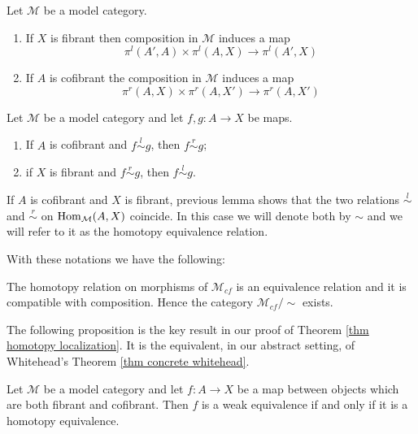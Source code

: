 \begin{lemma} \label{lemma hom homotopy category}
Let $\mathcal M$ be a model category.
\begin{enumerate}
\item If $X$ is fibrant then composition in $\mathcal M$ induces a map
\[
\pi^l(A',A) \times \pi^l(A,X) \to \pi^l(A',X)
\]
\item If $A$ is cofibrant the composition in $\mathcal M$ induces a map
\[
\pi^r(A,X) \times \pi^r(A,X') \to \pi^r(A,X')
\]
\end{enumerate}
\end{lemma}

\begin{lemma}
Let $\mathcal M$ be a model category and let $f,g \colon A \to X$ be maps.
\begin{enumerate}
\item If $A$ is cofibrant and $f \stackrel{l}{\sim} g$, then $f \stackrel{r}{\sim} g$;
\item if $X$ is fibrant and $f \stackrel{r}{\sim} g$, then $f \stackrel{l}{\sim} g$.
\end{enumerate}
\end{lemma}

\begin{notation}
If $A$ is cofibrant and $X$ is fibrant, previous lemma shows that the two relations $\stackrel{l}{\sim}$ and $\stackrel{r}{\sim}$ on $\mathrm{Hom}_{\mathcal M}(A,X)$ coincide. In this case we will denote both by $\sim$ and we will refer to it as the homotopy equivalence relation.
\end{notation}

With these notations we have the following:

\begin{cor} \label{cor weak homotopy category}
The homotopy relation on morphisms of $\mathcal M_{cf}$ is an equivalence relation and it is compatible with composition. Hence the category $\mathcal M_{cf} / \sim$ exists.
\end{cor}

The following proposition is the key result in our proof of Theorem \ref{thm homotopy localization}. It is the equivalent, in our abstract setting, of Whitehead's Theorem \ref{thm concrete whitehead}.

\begin{thm} \label{thm abstract whitehead}
Let $\mathcal M$ be a model category and let $f \colon A \to X$ be a map between objects which are both fibrant and cofibrant. Then $f$ is a weak equivalence if and only if it is a homotopy equivalence.
\end{thm}

